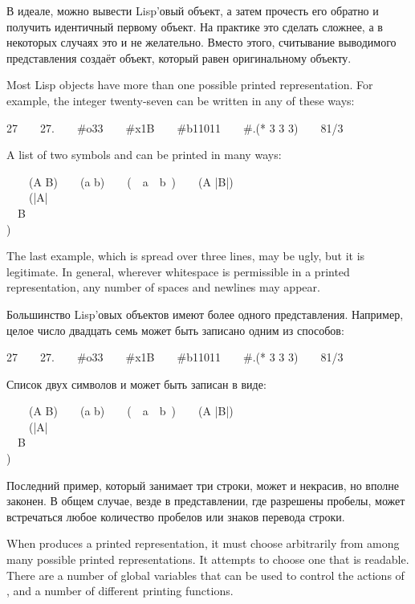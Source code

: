 В идеале, можно вывести Lisp'овый объект, а затем прочесть его обратно и
получить идентичный первому объект. На практике это сделать сложнее, а в
некоторых случаях это и не желательно. Вместо этого, считывание выводимого
представления создаёт объект, который равен  оригинальному объекту.

Most Lisp objects have more than one possible printed representation.
For example, the integer twenty-seven can be written in any of these ways:
\begin{lisp}
27~~~~27.~~~~\#o33~~~~\#x1B~~~~\#b11011~~~~\#.(* 3 3 3)~~~~81/3
\end{lisp}
A list of two symbols  and  can be printed in many ways:
\begin{lisp}
~~~~(A B)~~~~(a b)~~~~(~~a~~b~)~~~~({\Xbackslash}A |B|) \\
~~~~(|{\Xbackslash}A| \\
~~B \\
)
\end{lisp}
The last example, which is spread over three lines, may be ugly, but it
is legitimate.  In general, wherever whitespace is permissible in a printed
representation, any number of spaces and newlines may appear.

Большинство Lisp'овых объектов имеют более одного представления. Например, целое
число двадцать семь может быть записано одним из способов:
\begin{lisp}
27~~~~27.~~~~\#o33~~~~\#x1B~~~~\#b11011~~~~\#.(* 3 3 3)~~~~81/3
\end{lisp}
Список двух символов  и  может быть записан в виде:
\begin{lisp}
~~~~(A B)~~~~(a b)~~~~(~~a~~b~)~~~~({\Xbackslash}A |B|) \\
~~~~(|{\Xbackslash}A| \\
~~B \\
)
\end{lisp}
Последний пример, который занимает три строки, может и некрасив, но вполне
законен. В общем случае, везде в представлении, где разрешены пробелы, может
встречаться любое количество пробелов или знаков перевода строки.

When  produces a printed representation, it must choose arbitrarily
from among many possible printed representations.  It attempts to choose
one that is readable.  There are a number of global variables that can
be used to control the actions of , and a number of different
printing functions.

